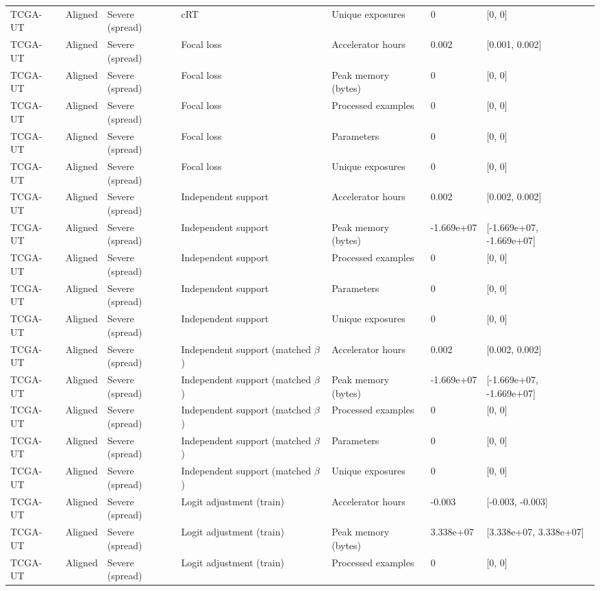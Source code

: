 \begin{longtable}{lllllll}
TCGA-UT & Aligned & Severe (spread) & cRT & Unique exposures & 0 & [0, 0] \\
TCGA-UT & Aligned & Severe (spread) & Focal loss & Accelerator hours & 0.002 & [0.001, 0.002] \\
TCGA-UT & Aligned & Severe (spread) & Focal loss & Peak memory (bytes) & 0 & [0, 0] \\
TCGA-UT & Aligned & Severe (spread) & Focal loss & Processed examples & 0 & [0, 0] \\
TCGA-UT & Aligned & Severe (spread) & Focal loss & Parameters & 0 & [0, 0] \\
TCGA-UT & Aligned & Severe (spread) & Focal loss & Unique exposures & 0 & [0, 0] \\
TCGA-UT & Aligned & Severe (spread) & Independent support & Accelerator hours & 0.002 & [0.002, 0.002] \\
TCGA-UT & Aligned & Severe (spread) & Independent support & Peak memory (bytes) & -1.669e+07 & [-1.669e+07, -1.669e+07] \\
TCGA-UT & Aligned & Severe (spread) & Independent support & Processed examples & 0 & [0, 0] \\
TCGA-UT & Aligned & Severe (spread) & Independent support & Parameters & 0 & [0, 0] \\
TCGA-UT & Aligned & Severe (spread) & Independent support & Unique exposures & 0 & [0, 0] \\
TCGA-UT & Aligned & Severe (spread) & Independent support (matched $\beta$) & Accelerator hours & 0.002 & [0.002, 0.002] \\
TCGA-UT & Aligned & Severe (spread) & Independent support (matched $\beta$) & Peak memory (bytes) & -1.669e+07 & [-1.669e+07, -1.669e+07] \\
TCGA-UT & Aligned & Severe (spread) & Independent support (matched $\beta$) & Processed examples & 0 & [0, 0] \\
TCGA-UT & Aligned & Severe (spread) & Independent support (matched $\beta$) & Parameters & 0 & [0, 0] \\
TCGA-UT & Aligned & Severe (spread) & Independent support (matched $\beta$) & Unique exposures & 0 & [0, 0] \\
TCGA-UT & Aligned & Severe (spread) & Logit adjustment (train) & Accelerator hours & -0.003 & [-0.003, -0.003] \\
TCGA-UT & Aligned & Severe (spread) & Logit adjustment (train) & Peak memory (bytes) & 3.338e+07 & [3.338e+07, 3.338e+07] \\
TCGA-UT & Aligned & Severe (spread) & Logit adjustment (train) & Processed examples & 0 & [0, 0] \\

\end{longtable}
